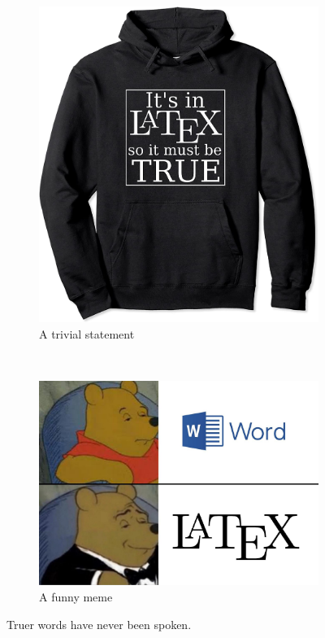 \documentclass[10pt]{article}
\begin{document}
    
    \begin{figure}[H]
        \centering
        \begin{subfigure}{.4\textwidth}
          \centering
          \includegraphics[width=.7\linewidth]{Images/latex_true.jpeg}
          \caption{A trivial statement}
          \label{fig:latex_true}
        \end{subfigure}%
        ~
        \begin{subfigure}{.4\textwidth}
          \centering
          \includegraphics[width=\linewidth]{Images/latex_meme.jpg}
          \caption{A funny meme}
          \label{fig:latex_meme}
        \end{subfigure}
        \caption{Truer words have never been spoken.}
        \label{fig:both_images}
    \end{figure}
\end{document}
